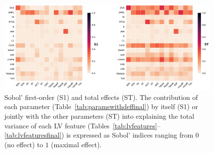 \begin{figure}[!ht]
    \myfloatalign
    \includegraphics[width=\textwidth]{figures/chapter07/gsa_16p_heatmap_S1_ST.pdf}
    \caption{Sobol' first-order (S1) and total effects (ST). The contribution of each parameter (Table~\ref{tab:paramswithdeffinal}) by itself (S1) or jointly with the other parameters (ST) into explaining the total variance of each LV feature (Tables~\ref{tab:lvfeatures}--\ref{tab:lvfeaturesfinal}) is expressed as Sobol' indices ranging from $0$ (no effect) to $1$ (maximal effect). }
    \label{fig:s1stheat}
\end{figure}


